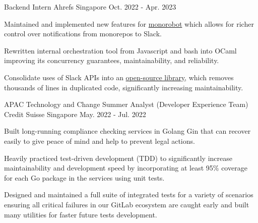 

\begin{cventries}
  \cventry
    {Backend Intern} %
    {Ahrefs} %
    {Singapore} %
    {Oct. 2022 - Apr. 2023} %
    {
      \begin{cvitems} %
        \item {Maintained and implemented new features for \href{https://github.com/ahrefs/monorobot}{monorobot} which allows for richer control over notifications from monorepos to Slack.}
        \item {Rewritten internal orchestration tool from Javascript and bash into OCaml improving its concurrency guarantees, maintainability, and reliability.}
        \item {Consolidate uses of Slack APIs into an \href{https://github.com/ahrefs/slack}{open-source library}, which removes thousands of lines in duplicated code, significantly increasing maintainability.}
      \end{cvitems}
    }

  \cventry
    {APAC Technology and Change Summer Analyst (Developer Experience Team)} %
    {Credit Suisse} %
    {Singapore} %
    {May. 2022 - Jul. 2022} %
    {
      \begin{cvitems} %
        \item {Built long-running compliance checking services in Golang Gin that can recover easily to give peace of mind and help to prevent legal actions.}
        \item {Heavily practiced test-driven development (TDD) to significantly increase maintainability and development speed by incorporating at least 95\% coverage for each Go package in the services using unit tests.}
        \item {Designed and maintained a full suite of integrated tests for a variety of scenarios ensuring all critical failures in our GitLab ecosystem are caught early and built many utilities for faster future tests development.}
      \end{cvitems}
    }


\end{cventries}
